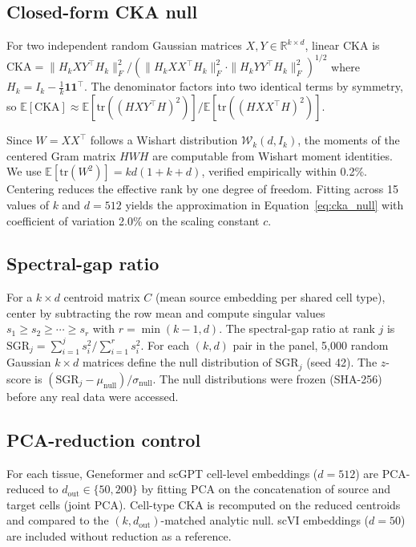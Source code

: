 \documentclass[11pt]{article}
\newcommand{\R}{\mathbb{R}}
\begin{document}
\subsection{Closed-form CKA null}
\label{sec:closedform}

For two independent random Gaussian matrices $X, Y \in \R^{k \times d}$,
linear CKA is $\mathrm{CKA} = \|H_k X Y^\top H_k\|_F^2 / (\|H_k X
X^\top H_k\|_F^2 \cdot \|H_k Y Y^\top H_k\|_F^2)^{1/2}$ where
$H_k = I_k - \frac{1}{k}\mathbf{1}\mathbf{1}^\top$. The denominator
factors into two identical terms by symmetry, so
$\mathbb{E}[\mathrm{CKA}] \approx \mathbb{E}[\mathrm{tr}((HXY^\top
H)^2)] / \mathbb{E}[\mathrm{tr}((HXX^\top H)^2)]$.

Since $W = XX^\top$ follows a Wishart distribution
$\mathcal{W}_k(d, I_k)$, the moments of the centered Gram matrix $HWH$
are computable from Wishart moment identities. We use
$\mathbb{E}[\mathrm{tr}(W^2)] = kd(1 + k + d)$, verified empirically
within 0.2\%. Centering reduces the effective rank by one degree of
freedom. Fitting across 15 values of $k$ and $d = 512$ yields the
approximation in Equation~\ref{eq:cka_null} with coefficient of
variation 2.0\% on the scaling constant $c$.

\subsection{Spectral-gap ratio}
\label{sec:sgrmethod}

For a $k \times d$ centroid matrix $C$ (mean source embedding per
shared cell type), center by subtracting the row mean and compute
singular values $s_1 \geq s_2 \geq \cdots \geq s_r$ with $r =
\min(k{-}1, d)$. The spectral-gap ratio at rank $j$ is $\mathrm{SGR}_j
= \sum_{i=1}^j s_i^2 / \sum_{i=1}^r s_i^2$. For each $(k, d)$ pair in
the panel, 5,000 random Gaussian $k \times d$ matrices define the null
distribution of $\mathrm{SGR}_j$ (seed 42). The $z$-score is
$({\mathrm{SGR}_j - \mu_{\mathrm{null}}}) / {\sigma_{\mathrm{null}}}$.
The null distributions were frozen (SHA-256) before any real data were
accessed.

\subsection{PCA-reduction control}

For each tissue, Geneformer and scGPT cell-level embeddings ($d = 512$)
are PCA-reduced to $d_{\mathrm{out}} \in \{50, 200\}$ by fitting PCA on
the concatenation of source and target cells (joint PCA). Cell-type CKA
is recomputed on the reduced centroids and compared to the
$(k, d_{\mathrm{out}})$-matched analytic null. scVI embeddings
($d = 50$) are included without reduction as a reference.
\end{document}

